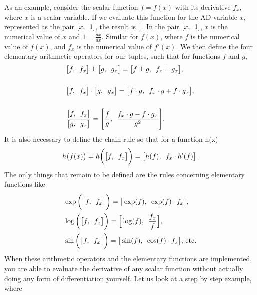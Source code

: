 As an example, consider the scalar function $f = f(x)$ with its derivative $f_x$, where $x$ is a scalar variable. If we evaluate this function for the AD-variable $x$, represented as the pair $[x,\hspace{0.5em}1]$, the result is []. In the pair $[x,\hspace{0.5em}1]$, $x$ is the numerical value of $x$ and $1 = \frac{dx}{dx}$. Similar for $f(x)$, where $f$ is the numerical value of $f(x)$, and $f_x$ is the numerical value of $f'(x)$.  We then define the four elementary arithmetic operators for our tuples, such that for functions $f$ and $g$,
\begin{equation}
    \begin{aligned}
    &\big[f,\hspace{0.5em}f_x\big] \pm \big[g,\hspace{0.5em}g_x   \big] = \big[f \pm g,\hspace{0.5em}f_x \pm g_x \big] ,\\\\
    &\big[  f,\hspace{0.5em}f_x   \big]\cdot \big[  g,\hspace{0.5em}g_x   \big] = \big[  f\cdot g,\hspace{0.5em}f_x\cdot g + f\cdot g_x   \big],\\\\
    &\frac{\big[ f,\hspace{0.5em}f_x   \big]}{\big[  g,\hspace{0.5em}g_x   \big]} = \Bigg[  \frac{f}{g},\hspace{0.5em}\frac{f_x\cdot g - f\cdot g_x}{g^2}\Bigg].
\end{aligned}
\label{eq:arithmeticOperators}
\end{equation}
It is also necessary to define the chain rule so that for a function h(x)
\begin{equation*}
h\big(f(x)\big) = h\bigg(\big[ f ,\hspace{0.5em}f_x  \big]\bigg) = \big[ h(f),\hspace{0.5em} f_x\cdot h'(f) \big].
\end{equation*}
The only things that remain to be defined are the rules concerning elementary functions like
\begin{equation}
    \begin{aligned}
    &\exp\bigg(\big[ f,\hspace{0.5em}f_x  \big]\bigg) =  \big[ \exp(f),\hspace{0.5em}\exp(f)\cdot f_x  \big],\\
    &\log\bigg(\big[ f,\hspace{0.5em}f_x  \big]\bigg) =  \Big[  \log(f),\hspace{0.5em}\frac{f_x}{f}   \Big],\\
    &\sin\bigg(\big[  f,\hspace{0.5em}f_x   \big]\bigg) =  \big[  \sin(f),\hspace{0.5em}\cos(f)\cdot f_x   \big]\text{,  etc.}
\end{aligned}
\label{eq:elementaryFunctions}
\end{equation}
When these arithmetic operators and the elementary functions are implemented, you are able to evaluate the derivative of any scalar function without actually doing any form of differentiation yourself. Let us look at a step by step example, where 
